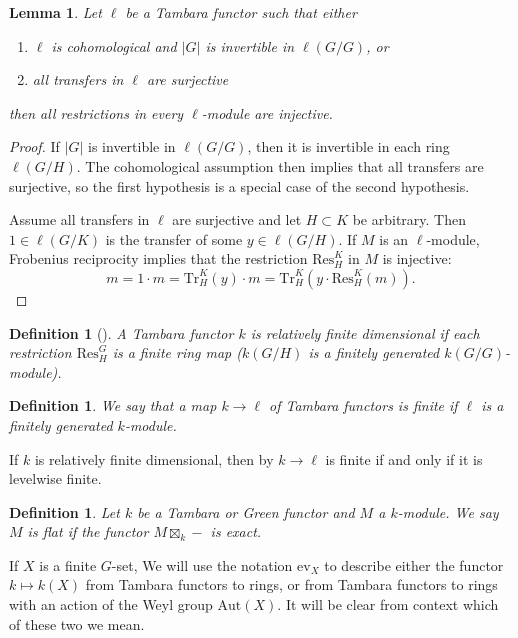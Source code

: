 \documentclass[11pt,dvipsnames]{amsart}
\newtheorem{lemma}[theorem]{Lemma}
\theoremstyle{BoldRemark}
\newtheorem{definition}[theorem]{Definition}
\newcommand{\Res}{\mathrm{Res}}
\newcommand{\Tr}{\mathrm{Tr}}
\newcommand{\ev}{\mathrm{ev}}
\begin{document}
\begin{lemma}\label{lem:sufficient-conditions-for-all-modules-to-be-FP}
	Let $\ell$ be a Tambara functor such that either
	\begin{enumerate}
		\item $\ell$ is cohomological and $|G|$ is invertible in $\ell(G/G)$, or
		\item all transfers in $\ell$ are surjective
	\end{enumerate}
	then all restrictions in every $\ell$-module are injective.
\end{lemma}

\begin{proof}
	If $|G|$ is invertible in $\ell(G/G)$, then it is invertible in each ring $\ell(G/H)$. The cohomological assumption then implies that all transfers are surjective, so the first hypothesis is a special case of the second hypothesis.
	
	Assume all transfers in $\ell$ are surjective and let $H \subset K$ be arbitrary. Then $1 \in \ell(G/K)$ is the transfer of some $y \in \ell(G/H)$. If $M$ is an $\ell$-module, Frobenius reciprocity implies that the restriction $\Res_H^K$ in $M$ is injective: 
    \[ 
        m = 1 \cdot m = \Tr_H^K(y) \cdot m = \Tr_H^K(y \cdot \Res_H^K(m)) .
    \]
\end{proof}

\begin{definition}[\cite{CW25}]
    A Tambara functor $k$ is \emph{relatively finite dimensional} if each restriction $\Res_H^G$ is a finite ring map ($k(G/H)$ is a finitely generated $k(G/G)$-module).
\end{definition}

\begin{definition}
	We say that a map $k \rightarrow \ell$ of Tambara functors is \emph{finite} if $\ell$ is a finitely generated $k$-module.
\end{definition}

If $k$ is relatively finite dimensional, then by \cite[Proposition 3.31]{CW25} $k \rightarrow \ell$ is finite if and only if it is levelwise finite.

\begin{definition}
    Let $k$ be a Tambara or Green functor and $M$ a $k$-module. We say $M$ is flat if the functor $M \boxtimes_k -$ is exact.
\end{definition}

If $X$ is a finite $G$-set, We will use the notation $\ev_{X}$ to describe either the functor $k \mapsto k(X)$ from Tambara functors to rings, or from Tambara functors to rings with an action of the Weyl group $\mathrm{Aut}(X)$. It will be clear from context which of these two we mean.
\end{document}
